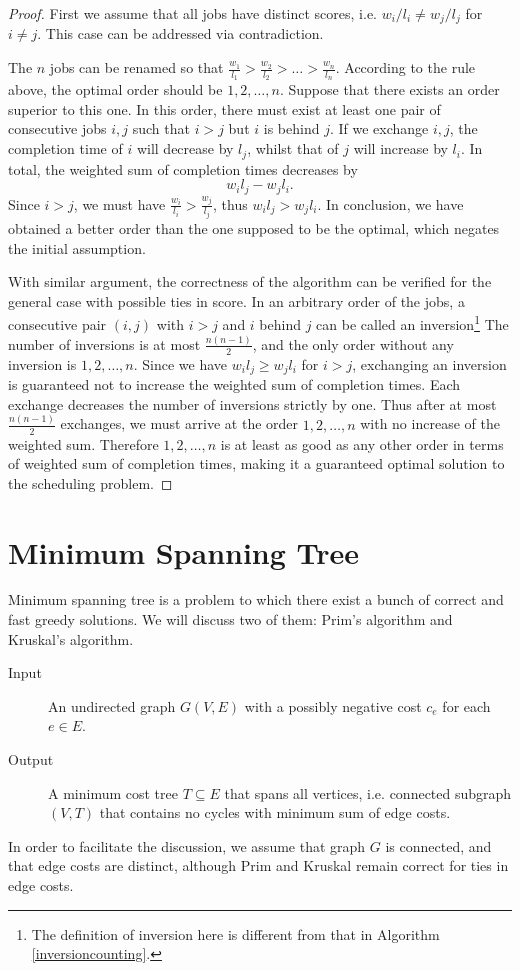 \begin{proof}
First we assume that all jobs have distinct scores, i.e. $w_i/l_i\neq w_j/l_j$ for $i\neq j$. This case can be addressed via contradiction.

The $n$ jobs can be renamed so that $\frac{w_1}{l_1}>\frac{w_2}{l_2}>\dots>\frac{w_n}{l_n}$. According to the rule above, the optimal order should be $1,2,\dots,n$. Suppose that there exists an order superior to this one. In this order, there must exist at least one pair of consecutive jobs $i,j$ such that $i>j$ but $i$ is behind $j$. If we exchange $i,j$, the completion time of $i$ will decrease by $l_j$, whilst that of $j$ will increase by $l_i$. In total, the weighted sum of completion times decreases by
$$w_il_j-w_jl_i.$$
Since $i>j$, we must have $\frac{w_i}{l_i}>\frac{w_j}{l_j}$, thus $w_il_j>w_jl_i$. In conclusion, we have obtained a better order than the one supposed to be the optimal, which negates the initial assumption.

With similar argument, the correctness of the algorithm can be verified for the general case with possible ties in score. In an arbitrary order of the jobs, a consecutive pair $(i,j)$ with $i>j$ and $i$ behind $j$ can be called an inversion\footnote{The definition of inversion here is different from that in Algorithm \ref{inversioncounting}.} The number of inversions is at most $\frac{n(n-1)}{2}$, and the only order without any inversion is $1,2,\dots,n$. Since we have $w_il_j\geq w_jl_i$ for $i>j$, exchanging an inversion is guaranteed not to increase the weighted sum of completion times. Each exchange decreases the number of inversions strictly by one. Thus after at most $\frac{n(n-1)}{2}$ exchanges, we must arrive at the order $1,2,\dots,n$ with no increase of the weighted sum. Therefore $1,2,\dots,n$ is at least as good as any other order in terms of weighted sum of completion times, making it a guaranteed optimal solution to the scheduling problem.
\end{proof}
\section{Minimum Spanning Tree}
Minimum spanning tree is a problem to which there exist a bunch of correct and fast greedy solutions. We will discuss two of them: Prim's algorithm and Kruskal's algorithm.
\begin{description}
\item[Input]An undirected graph $G(V,E)$ with a possibly negative cost $c_e$ for each $e\in E$. 
\item[Output]A minimum cost tree $T\subseteq E$ that spans all vertices, i.e. connected subgraph $(V,T)$ that contains no cycles with minimum sum of edge costs.
\end{description}
In order to facilitate the discussion, we assume that graph $G$ is connected, and that edge costs are distinct, although Prim and Kruskal remain correct for ties in edge costs.
